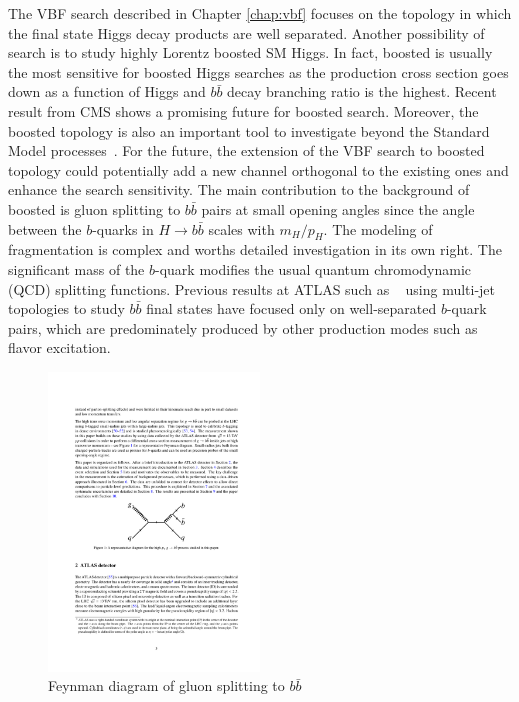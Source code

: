 The VBF \Hbb search described in Chapter \ref{chap:vbf} focuses on the topology in which the final state Higgs decay products are well separated. Another possibility of \Hbb search is to study highly Lorentz boosted SM Higgs. In fact, boosted \Hbb is usually the most sensitive for boosted Higgs searches as the production cross section goes down as a function of Higgs \pt and $b\bar b$ decay branching ratio is the highest. Recent result from CMS \cite{Aaboud:2017ecz} shows a promising future for boosted \Hbb search. Moreover, the boosted \Hbb topology is also an important tool to investigate beyond the Standard Model processes~\cite{Aaboud:2017ahz,Aaboud:2017yqz,Aaboud:2016xco,Khachatryan:2016cfa,Sirunyan:2017nrt}. For the future, the extension of the VBF \Hbb search to boosted topology could potentially add a new channel orthogonal to the existing ones and enhance the search sensitivity. The main contribution to the background of boosted \Hbb is gluon splitting to $b \bar{b}$ pairs at small opening angles since the angle between the $b$-quarks in $H\rightarrow b\bar{b}$ scales with $m_H/p_H$. The modeling of \gbb fragmentation is complex and worths detailed investigation in its own right. The significant mass of the $b$-quark modifies the usual quantum chromodynamic (QCD) splitting functions. Previous results at ATLAS such as ~\cite{Aaboud:2016jed} using multi-jet topologies to study $b\bar b$ final states have focused only on well-separated $b$-quark pairs, which are predominately produced by other production modes such as flavor excitation.


\begin{figure}[htbp]
  \centering
 \includegraphics[width=0.5\textwidth]{figures/gbb/gbb_feynman}
\caption{Feynman diagram of gluon splitting to $b\bar{b}$}
  \label{fig:gbb-feynman}
\end{figure}


